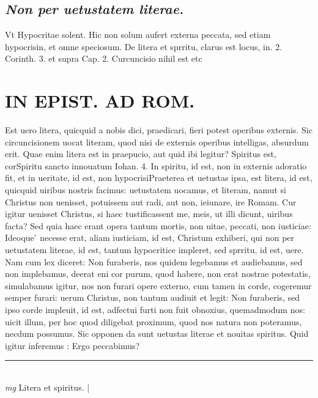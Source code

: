 \documentclass{article}
\begin{document}
\begin{pages}
\subsection*{\textit{Non per uetustatem literae. }}\pstart Vt Hypocritae solent. Hic non solum aufert externa peccata, sed etiam hypocrisin, et omne speciosum. De litera et sprritu, clarus est locus, in. 2. Corinth. 3. et supra Cap. 2. Curcuncisio nihil est etc\pend
\section*{IN EPIST. AD ROM.  }
\marginpar{[ p.70 ]}\pstart Est uero litera, quicquid a nobis dici, praedicari, fieri potest operibus externis. Sic circuncisionem uocat literam, quod nisi de externis operibus intelligas, absurdum erit. Quae enim litera est in praepucio, aut quid ibi legitur? Spiritus est, corSpiritu sancto innouatum Iohan. 4. In spiritu, id est, non in externis adoratio fit, et in ueritate, id est, non hypocrisiPraeterea et uetustas ipsa, est litera, id est, quicquid uiribus nostris facimus: uetustatem uocamus, et literam, namut si Christus non uenisset, potuissem aut radi, aut non, ieiunare, ire Romam. Cur igitur uenisset Christus, si haec tustificassent me, meis, ut illi dicunt, uiribus facta? Sed quia haec erant opera tantum mortis, non uitae, peccati, non iusticiae: Ideoque ́ necesse erat, aliam iusticiam, id est, Christum exhiberi, qui non per uetustatem literae, id est, tantum hypocritice impleret, sed sprritu, id est, uere. Nam cum lex diceret: Non furaberis, nos quidem legebamus et audiebamus, sed non implebamus, deerat eni cor purum, quod habere, non erat nostrae potestatis, simulabamus igitur, nos non furari opere externo, cum tamen in corde, cogeremur semper furari: uerum Christus, non tantum audiuit et legit: Non furaberis, sed ipso corde impleuit, id est, adfectui furti non fuit obnoxius, quemadmodum nos: uicit illum, per hoc quod diligebat proximum, quod nos natura non poteramus, necdum possumus. Sic opponen da sunt uetustas literae et nouitas spiritus. Quid igitur inferemus : Ergo peccabimus?  \pend
\vspace{0.5cm}\noindent
\vspace{0.2cm}\rule{1cm}{0.2pt}\\ 
\hspace{0.2cm}\textit{mg}
\footnotesize Litera et spiritus.  
\normalsize| 

\end{pages}
\end{document}

